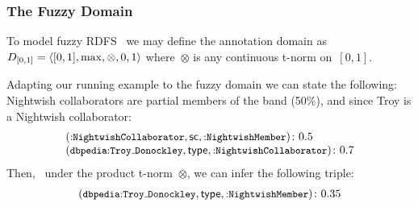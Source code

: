 \subsubsection{The Fuzzy Domain}
To model fuzzy \ac{RDFS}~\cite{Straccia:2009aa} we may define the annotation domain as~$D_{[0,1]} = \langle [0,1], \max,
  \otimes, 0, 1 \rangle$ where~$\otimes$ is any continuous t-norm on~$[0,1]$.
%
\begin{example}
  \label{exUSf}
  Adapting our running example to the fuzzy domain we can state the following:
  Nightwish collaborators are partial members of the band (50\%), and since Troy is a Nightwish collaborator:
  \[
  \begin{array}{l}
    \fuzzyg{\triple{\qname{}{NightwishCollaborator}, \subclass, \qname{}{NightwishMember}}}{0.5} \\
    \fuzzyg{\triple{\qname{dbpedia}{Troy\mathunderscore{}Donockley}, \typeR, \qname{}{NightwishCollaborator}}}{0.7}
  \end{array}
  \]
  \nd Then, \eg~under the product t-norm~$\otimes$, we can infer the following triple:
  \[
  \begin{array}{l}
    \fuzzyg{\triple{\qname{dbpedia}{Troy\mathunderscore{}Donockley}, \typeR, \qname{}{NightwishMember}}}{0.35}
  \end{array}
  \]
\end{example}
















